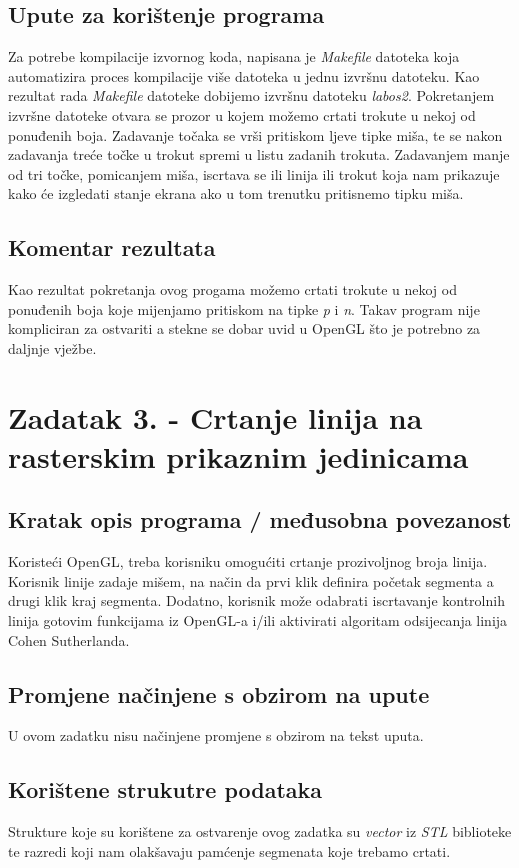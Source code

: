 \documentclass{report}
\begin{document}
\subsection{Upute za korištenje programa}
Za potrebe kompilacije izvornog koda, napisana je \textit{Makefile} datoteka koja automatizira proces kompilacije više datoteka u jednu izvršnu datoteku. Kao rezultat rada \textit{Makefile} datoteke dobijemo izvršnu datoteku \textit{labos2}. Pokretanjem izvršne datoteke otvara se prozor   u kojem možemo crtati trokute u nekoj od ponuđenih boja. Zadavanje točaka se vrši pritiskom ljeve tipke miša, te se nakon zadavanja treće točke u trokut spremi u listu zadanih trokuta. Zadavanjem manje od tri točke, pomicanjem miša, iscrtava se ili linija ili trokut koja nam prikazuje kako će izgledati stanje ekrana ako u tom trenutku pritisnemo tipku miša.

\subsection{Komentar rezultata}
Kao rezultat pokretanja ovog progama možemo crtati trokute u nekoj od ponuđenih boja koje mijenjamo pritiskom na tipke \textit{p} i \textit{n}. Takav program nije kompliciran za ostvariti a stekne se dobar uvid u OpenGL što je potrebno za daljnje vježbe.

\section{Zadatak 3. - Crtanje linija na rasterskim prikaznim jedinicama}
\subsection{Kratak opis programa / međusobna povezanost}
Koristeći OpenGL, treba korisniku omogućiti crtanje prozivoljnog broja linija. Korisnik linije zadaje mišem, na način da prvi klik definira početak segmenta a drugi klik kraj segmenta. Dodatno, korisnik može odabrati iscrtavanje kontrolnih linija gotovim funkcijama iz OpenGL-a i/ili aktivirati algoritam odsijecanja linija Cohen Sutherlanda.

\subsection{Promjene načinjene s obzirom na upute}
U ovom zadatku nisu načinjene promjene s obzirom na tekst uputa.

\subsection{Korištene strukutre podataka}
Strukture koje su korištene za ostvarenje ovog zadatka su \textit{vector} iz \textit{STL} biblioteke te razredi koji nam olakšavaju pamćenje segmenata koje trebamo crtati.
\end{document}
